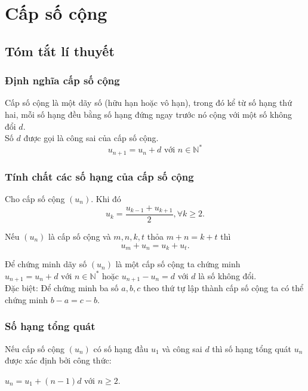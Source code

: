 \section{Cấp số cộng}
\subsection{Tóm tắt lí thuyết}
\subsubsection{Định nghĩa cấp số cộng}
Cấp số cộng là một dãy số (hữu hạn hoặc vô hạn), trong đó kể từ số hạng thứ hai, mỗi số hạng đều bằng số hạng đứng ngay trước nó cộng với một số không đổi $d$.\\
Số $d$ được gọi là công sai của cấp số cộng.
$$u_{n+1}=u_n + d \text{ với } n\in \mathbb{N^*}$$

\subsubsection{Tính chất các số hạng của cấp số cộng}
\begin{dl}
	Cho cấp số cộng $(u_n)$. Khi đó
	$$u_k=\dfrac{u_{k-1}+u_{k+1}}{2}, \forall k\geq 2.$$
\end{dl}
\begin{hq}
	Nếu $(u_n)$ là cấp số cộng và $m,n,k,t$ thỏa $m+n=k+t$ thì $$u_m+u_n=u_k+u_t.$$
\end{hq}
\begin{note}
	Để chứng minh dãy số $(u_n)$ là một cấp số cộng ta chứng minh $u_{n+1}=u_n + d \text{ với } n\in \mathbb{N^*}$ hoặc $u_{n+1} - u_n = d$ với $d$ là số không đổi.\\
	Đặc biệt: Để chứng minh ba số $a, b, c$ theo thứ tự lập thành cấp số cộng ta có thể chứng minh $b-a = c-b$.
\end{note}

\subsubsection{Số hạng tổng quát}
\begin{dl}
	Nếu cấp số cộng $(u_n)$ có số hạng đầu $u_1$ và công sai $d$ thì số hạng tổng quát $u_n$ được xác định bởi công thức:
	\begin{center}
		$u_n=u_1+(n-1)d$ với $n\geq 2.$ 
	\end{center}
\end{dl}

